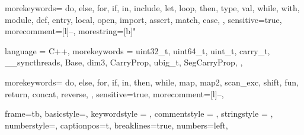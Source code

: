 {
  morekeywords={
    do,
    else,
    for,
    if,
    in,
    include,
    let,
    loop,
    then,
    type,
    val,
    while,
    with,
    module,
    def,
    entry,
    local,
    open,
    import,
    assert,
    match,
    case,
  },
  sensitive=true, %
  morecomment=[l]{--}, %
  morestring=[b]" %
}

{
  language = C++,
  morekeywords = {
    uint32_t,
    uint64_t,
    uint_t,
    carry_t,
    __syncthreads,
    Base,
    dim3,
    CarryProp,
    ubig_t,
    SegCarryProp,
  },
}

{
  morekeywords={
    do,
    else,
    for,
    if,
    in,
    then,
    while,
    map,
    map2,
    scan_exc,
    shift,
    fun,
    return,
    concat,
    reverse,
  },
  sensitive=true,
  morecomment=[l]{--},
}

{
  frame=tb,
  basicstyle=\footnotesize\ttfamily,
  keywordstyle = \color{RoyalBlue},
  commentstyle = \color{ForestGreen},
  stringstyle = \color{purple},
  numberstyle=\scriptsize\color{darkgray},
  captionpos=t,
  breaklines=true,
  numbers=left,
}

\lstset{style=myStyle}  



